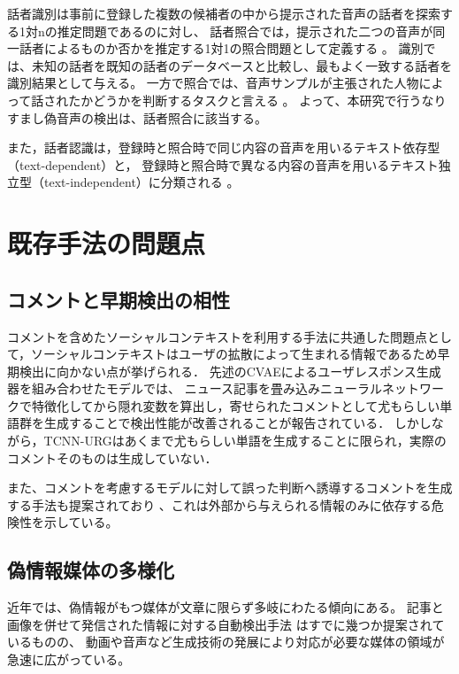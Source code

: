 話者識別は事前に登録した複数の候補者の中から提示された音声の話者を探索する1対nの推定問題であるのに対し、
話者照合では，提示された二つの音声が同一話者によるものか否かを推定する1対1の照合問題として定義する \cite{俵直弘2022}。
識別では、未知の話者を既知の話者のデータベースと比較し、最もよく一致する話者を識別結果として与える。
一方で照合では、音声サンプルが主張された人物によって話されたかどうかを判断するタスクと言える \cite{1561284}。
よって、本研究で行うなりすまし偽音声の検出は、話者照合に該当する。

また，話者認識は，登録時と照合時で同じ内容の音声を用いるテキスト依存型（text-dependent）と，
登録時と照合時で異なる内容の音声を用いるテキスト独立型（text-independent）に分類される \cite{俵直弘2022}。

\section{既存手法の問題点}
\subsection{コメントと早期検出の相性}
コメントを含めたソーシャルコンテキストを利用する手法に共通した問題点として，ソーシャルコンテキストはユーザの拡散によって生まれる情報であるため早期検出に向かない点が挙げられる．
先述のCVAEによるユーザレスポンス生成器を組み合わせたモデル\cite{ijcai2018-533}では、
ニュース記事を畳み込みニューラルネットワークで特徴化してから隠れ変数を算出し，寄せられたコメントとして尤もらしい単語群を生成することで検出性能が改善されることが報告されている．
しかしながら，TCNN-URGはあくまで尤もらしい単語を生成することに限られ，実際のコメントそのものは生成していない．

また、コメントを考慮するモデルに対して誤った判断へ誘導するコメントを生成する手法も提案されており \cite{9338282}、これは外部から与えられる情報のみに依存する危険性を示している。

\subsection{偽情報媒体の多様化}
近年では、偽情報がもつ媒体が文章に限らず多岐にわたる傾向にある。
記事と画像を併せて発信された情報に対する自動検出手法 \cite{10.1145/3219819.3219903,8919302}はすでに幾つか提案されているものの、
動画や音声など生成技術の発展により対応が必要な媒体の領域が急速に広がっている。

